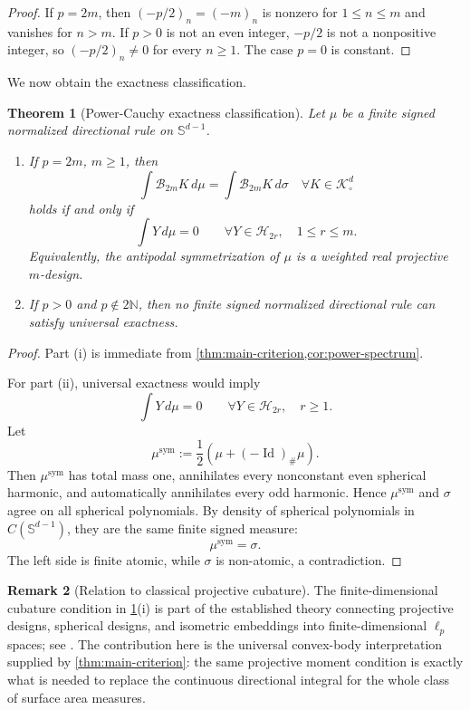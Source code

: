 \documentclass[12pt,a4paper]{article}
\newcommand{\Sph}{\mathbb S}
\newcommand{\N}{\mathbb N}
\newcommand{\K}{\mathcal K}
\newcommand{\Harm}{\mathcal H}
\newcommand{\cB}{\mathcal B}
\newcommand{\Id}{\operatorname{Id}}
\newcommand{\sym}{\operatorname{sym}}
\theoremstyle{plain}
\newtheorem{theorem}{Theorem}[section]
\theoremstyle{definition}
\newtheorem{remark}[theorem]{Remark}
\begin{document}
\begin{proof}
If $p=2m$, then $(-p/2)_n=(-m)_n$ is nonzero for $1\le n\le m$ and vanishes for $n>m$.  If $p>0$ is not an even integer, $-p/2$ is not a nonpositive integer, so $(-p/2)_n\ne0$ for every $n\ge1$.  The case $p=0$ is constant.
\end{proof}

We now obtain the exactness classification.

\begin{theorem}[Power-Cauchy exactness classification]\label{thm:power-classification}
Let $\mu$ be a finite signed normalized directional rule on $\Sph^{d-1}$.
\begin{enumerate}
\item If $p=2m$, $m\ge1$, then
\begin{equation}\label{eq:power-exact-iff}
 \int\cB_{2m}K\,d\mu
 =\int\cB_{2m}K\,d\sigma
 \quad\forall K\in\K^d_\circ
\end{equation}
holds if and only if
\begin{equation}\label{eq:projective-moments}
 \int Y\,d\mu=0
 \qquad\forall Y\in\Harm_{2r},\quad 1\le r\le m.
\end{equation}
Equivalently, the antipodal symmetrization of $\mu$ is a weighted real projective $m$-design.
\item If $p>0$ and $p\notin2\N$, then no finite signed normalized directional rule can satisfy universal exactness.
\end{enumerate}
\end{theorem}

\begin{proof}
Part (i) is immediate from \cref{thm:main-criterion,cor:power-spectrum}.

For part (ii), universal exactness would imply
\[
 \int Y\,d\mu=0
 \qquad\forall Y\in\Harm_{2r},\quad r\ge1.
\]
Let
\[
 \mu^{\sym}:=\frac12(\mu+(-\Id)_\#\mu).
\]
Then $\mu^{\sym}$ has total mass one, annihilates every nonconstant even spherical harmonic, and automatically annihilates every odd harmonic.  Hence $\mu^{\sym}$ and $\sigma$ agree on all spherical polynomials.  By density of spherical polynomials in $C(\Sph^{d-1})$, they are the same finite signed measure:
\[
 \mu^{\sym}=\sigma.
\]
The left side is finite atomic, while $\sigma$ is non-atomic, a contradiction.
\end{proof}

\begin{remark}[Relation to classical projective cubature]
The finite-dimensional cubature condition in \cref{thm:power-classification}(i) is part of the established theory connecting projective designs, spherical designs, and isometric embeddings into finite-dimensional $\ell_p$ spaces; see \cite{LyubichVaserstein,Lyubich2009}.  The contribution here is the universal convex-body interpretation supplied by \cref{thm:main-criterion}: the same projective moment condition is exactly what is needed to replace the continuous directional integral for the whole class of surface area measures.
\end{remark}
\end{document}
